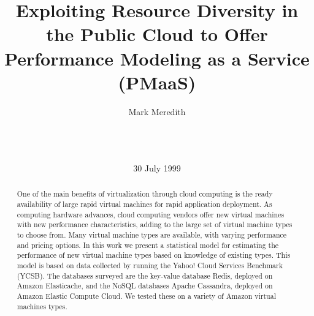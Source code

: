 \documentclass{acm_proc_article-sp}
\begin{document}
\title{Exploiting Resource Diversity in the Public Cloud to Offer Performance Modeling as a Service (PMaaS)}

\author{
%
%
\alignauthor
Mark Meredith\\
       \\
       \\
       \\
}
\date{30 July 1999}

\maketitle
\begin{abstract}
One of the main benefits of virtualization through cloud computing is the ready availability of large rapid virtual machines for rapid application deployment. As computing hardware advances, cloud computing vendors offer new virtual machines with new performance characteristics, adding to the large set of virtual machine types to choose from. Many virtual machine types are available, with varying performance and pricing options. In this work we present a statistical model for estimating the performance of new virtual machine types based on knowledge of existing types. This model is based on data collected by running the Yahoo! Cloud Services Benchmark (YCSB). The databases surveyed are the key-value database Redis, deployed on Amazon Elasticache, and the NoSQL databases Apache Cassandra, deployed on Amazon Elastic Compute Cloud. We tested these on a variety of Amazon virtual machines types.

\end{abstract}
\end{document}
